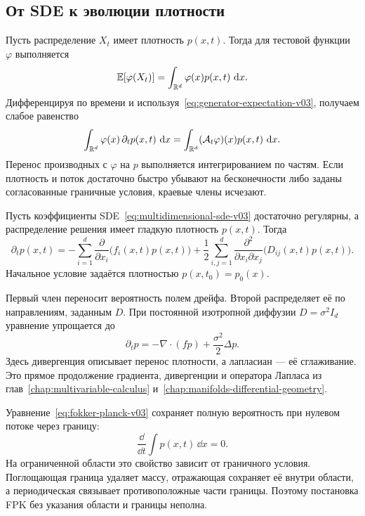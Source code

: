 \subsection{От SDE к эволюции плотности}

Пусть распределение $X_t$ имеет плотность $p(x,t)$. Тогда для тестовой функции $\varphi$ выполняется
\begin{equation}
\label{eq:expectation-density-v03}
\mathbb E[\varphi(X_t)]
=
\int_{\mathbb{R}^d}\varphi(x)p(x,t)\,\mathop{}\!\mathrm{d} x.
\end{equation}
Дифференцируя по времени и используя~\eqref{eq:generator-expectation-v03}, получаем слабое равенство
\begin{equation}
\label{eq:fpk-weak-form-v03}
\int_{\mathbb{R}^d}
\varphi(x)\,\partial_t p(x,t)\,\mathop{}\!\mathrm{d} x
=
\int_{\mathbb{R}^d}
(\mathcal A_t\varphi)(x)p(x,t)\,\mathop{}\!\mathrm{d} x.
\end{equation}
Перенос производных с $\varphi$ на $p$ выполняется интегрированием по частям. Если плотность и поток достаточно быстро убывают на бесконечности либо заданы согласованные граничные условия, краевые члены исчезают.

\begin{theorem}
Пусть коэффициенты SDE~\eqref{eq:multidimensional-sde-v03} достаточно регулярны, а распределение решения имеет гладкую плотность $p(x,t)$. Тогда
\begin{equation}
\label{eq:fokker-planck-v03}
\partial_t p(x,t)
=
-\sum_{i=1}^{d}
\frac{\partial}{\partial x_i}
\bigl(f_i(x,t)p(x,t)\bigr)
+
\frac12
\sum_{i,j=1}^{d}
\frac{\partial^2}{\partial x_i\partial x_j}
\bigl(D_{ij}(x,t)p(x,t)\bigr).
\end{equation}
Начальное условие задаётся плотностью $p(x,t_0)=p_0(x)$.
\end{theorem}

Первый член переносит вероятность полем дрейфа. Второй распределяет её по направлениям, заданным $D$. При постоянной изотропной диффузии $D=\sigma^2I_d$ уравнение упрощается до
\begin{equation}
\label{eq:fpk-isotropic-v03}
\partial_t p
=
-\nabla\cdot(fp)
+
\frac{\sigma^2}{2}\Delta p.
\end{equation}
Здесь дивергенция описывает перенос плотности, а лапласиан --- её сглаживание. Это прямое продолжение градиента, дивергенции и оператора Лапласа из глав~\ref{chap:multivariable-calculus} и~\ref{chap:manifolds-differential-geometry}.

Уравнение~\eqref{eq:fokker-planck-v03} сохраняет полную вероятность при нулевом потоке через границу:
\[
\frac{\dd}{\dd t}
\int p(x,t)\,\dd x
=0.
\]
На ограниченной области это свойство зависит от граничного условия. Поглощающая граница удаляет массу, отражающая сохраняет её внутри области, а периодическая связывает противоположные части границы. Поэтому постановка FPK без указания области и границы неполна.

